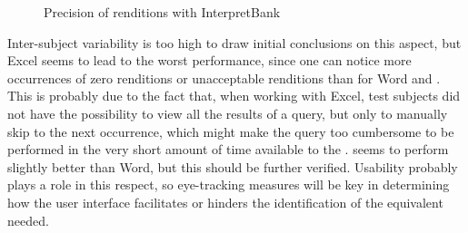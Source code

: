 \documentclass[output=paper]{langsci/langscibook}
\begin{document}
\begin{figure}[p]
\caption{Precision of renditions with InterpretBank \label{fig:prandi:14}}
\end{figure}

Inter-subject variability is too high to draw initial conclusions on this aspect, but Excel seems to lead to the worst performance, since one can notice more occurrences of zero renditions or unacceptable renditions than for Word and . This is probably due to the fact that, when working with Excel, test subjects did not have the possibility to view all the results of a query, but only to manually skip to the next occurrence, which might make the query too cumbersome to be performed in the very short amount of time available to the .  seems to perform slightly better than Word, but this should be further verified. Usability probably plays a role in this respect, so eye-tracking measures will be key in determining how the user interface facilitates or hinders the identification of the equivalent needed.
\end{document}
